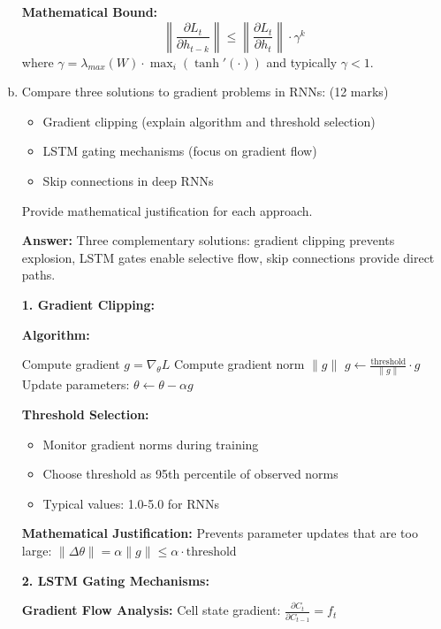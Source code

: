 \documentclass[12pt]{article}
\newcommand{\answer}[1]{{\color{answercolor}\textbf{Answer:} #1}}
\newcommand{\explanation}[1]{{\color{explanationcolor}#1}}
\begin{document}
\begin{enumerate}[(a)]
{    \textbf{Mathematical Bound:}
    $$\left\|\frac{\partial L_t}{\partial h_{t-k}}\right\| \leq \left\|\frac{\partial L_t}{\partial h_t}\right\| \cdot \gamma^k$$
    where $\gamma = \lambda_{max}(W) \cdot \max_i(\tanh'(\cdot))$ and typically $\gamma < 1$.
    }
    
    \item Compare three solutions to gradient problems in RNNs: \hfill (12 marks)
    \begin{itemize}
        \item Gradient clipping (explain algorithm and threshold selection)
        \item LSTM gating mechanisms (focus on gradient flow)
        \item Skip connections in deep RNNs
    \end{itemize}
    
    Provide mathematical justification for each approach.
    
    \answer{Three complementary solutions: gradient clipping prevents explosion, LSTM gates enable selective flow, skip connections provide direct paths.}
    
    \explanation{
    \textbf{1. Gradient Clipping:}
    
    \textbf{Algorithm:}
    \begin{algorithmic}
    \STATE Compute gradient $g = \nabla_\theta L$
    \STATE Compute gradient norm $\|g\|$
    \IF{$\|g\| > \text{threshold}$}
        \STATE $g \leftarrow \frac{\text{threshold}}{\|g\|} \cdot g$
    \ENDIF
    \STATE Update parameters: $\theta \leftarrow \theta - \alpha g$
    \end{algorithmic}
    
    \textbf{Threshold Selection:}
    \begin{itemize}
        \item Monitor gradient norms during training
        \item Choose threshold as 95th percentile of observed norms
        \item Typical values: 1.0-5.0 for RNNs
    \end{itemize}
    
    \textbf{Mathematical Justification:}
    Prevents parameter updates that are too large: $\|\Delta \theta\| = \alpha \|g\| \leq \alpha \cdot \text{threshold}$
    
    \textbf{2. LSTM Gating Mechanisms:}
    
    \textbf{Gradient Flow Analysis:}
    Cell state gradient: $\frac{\partial C_t}{\partial C_{t-1}} = f_t$
    
}
\end{enumerate}
\end{document}
